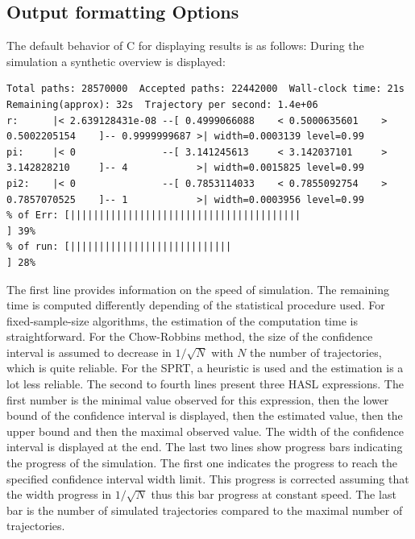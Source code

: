 \documentclass{article}
\newcommand{\cosmos}{\mbox{\textup{C}\scalebox{0.75}{{\textsc{OSMOS}}}}}
\begin{document}
\subsection{Output formatting Options}
The default behavior of \cosmos{} for displaying results is as follows:
During the simulation a synthetic overview is displayed:
\begin{scriptsize}
\begin{verbatim}
Total paths: 28570000  Accepted paths: 22442000  Wall-clock time: 21s  Remaining(approx): 32s  Trajectory per second: 1.4e+06
r:      |< 2.639128431e-08 --[ 0.4999066088    < 0.5000635601    > 0.5002205154    ]-- 0.9999999687 >| width=0.0003139 level=0.99
pi:     |< 0               --[ 3.141245613     < 3.142037101     > 3.142828210     ]-- 4            >| width=0.0015825 level=0.99
pi2:    |< 0               --[ 0.7853114033    < 0.7855092754    > 0.7857070525    ]-- 1            >| width=0.0003956 level=0.99
% of Err: [||||||||||||||||||||||||||||||||||||||||                                                       ] 39%	
% of run: [||||||||||||||||||||||||||||                                                                   ] 28%	
\end{verbatim}
\end{scriptsize}
The first line provides information on the speed of simulation. The
remaining time is computed differently depending of the statistical
procedure used. For fixed-sample-size algorithms, the estimation of
the computation time is straightforward. For the Chow-Robbins method,
the size of the confidence interval is assumed to decrease in
$1/\sqrt{N}$ with $N$ the number of trajectories, which is quite
reliable. For the SPRT, a heuristic is used and the estimation is a lot
less reliable.  The second to fourth lines present three HASL
expressions. The first number is the minimal value observed for this
expression, then the lower bound of the confidence interval is
displayed, then the estimated value, then the upper bound and then the
maximal observed value. The width of the confidence interval is
displayed at the end.  The last two lines show progress bars indicating
the progress of the simulation. The first one indicates the progress to
reach the specified confidence interval width limit. This progress is
corrected assuming that the width progress in $1/\sqrt{N}$ thus this
bar progress at constant speed. The last bar is the number of
simulated trajectories compared to the maximal number of trajectories.
\end{document}
